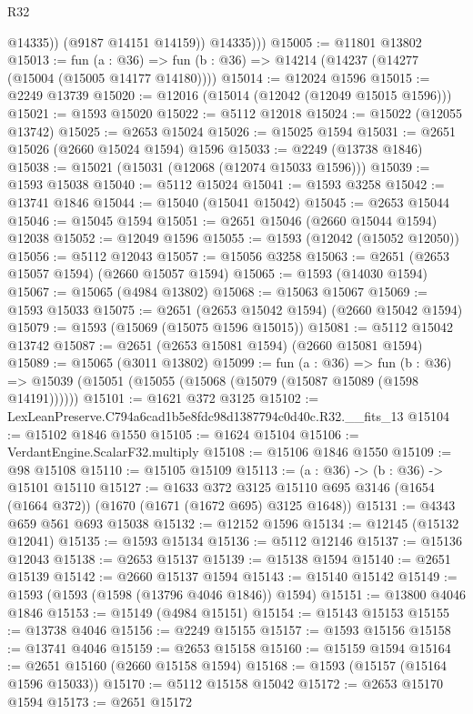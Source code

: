 \begin{lexlean}{R32}
\begin{coremodule}
                @14335))
            (@9187 @14151 @14159))
          @14335)))
@15005 := @11801 @13802
@15013 := fun (a : @36) => fun (b : @36) => @14214 (@14237 (@14277 (@15004 (@15005 @14177 @14180))))
@15014 := @12024 @1596
@15015 := @2249 @13739
@15020 := @12016 (@15014 (@12042 (@12049 @15015 @1596)))
@15021 := @1593 @15020
@15022 := @5112 @12018
@15024 := @15022 (@12055 @13742)
@15025 := @2653 @15024
@15026 := @15025 @1594
@15031 := @2651 @15026 (@2660 @15024 @1594) @1596
@15033 := @2249 (@13738 @1846)
@15038 := @15021 (@15031 (@12068 (@12074 @15033 @1596)))
@15039 := @1593 @15038
@15040 := @5112 @15024
@15041 := @1593 @3258
@15042 := @13741 @1846
@15044 := @15040 (@15041 @15042)
@15045 := @2653 @15044
@15046 := @15045 @1594
@15051 := @2651 @15046 (@2660 @15044 @1594) @12038
@15052 := @12049 @1596
@15055 := @1593 (@12042 (@15052 @12050))
@15056 := @5112 @12043
@15057 := @15056 @3258
@15063 := @2651 (@2653 @15057 @1594) (@2660 @15057 @1594)
@15065 := @1593 (@14030 @1594)
@15067 := @15065 (@4984 @13802)
@15068 := @15063 @15067
@15069 := @1593 @15033
@15075 := @2651 (@2653 @15042 @1594) (@2660 @15042 @1594)
@15079 := @1593 (@15069 (@15075 @1596 @15015))
@15081 := @5112 @15042 @13742
@15087 := @2651 (@2653 @15081 @1594) (@2660 @15081 @1594)
@15089 := @15065 (@3011 @13802)
@15099 := fun (a : @36) =>
  fun (b : @36) => @15039 (@15051 (@15055 (@15068 (@15079 (@15087 @15089 (@1598 @14191))))))
@15101 := @1621 @372 @3125
@15102 := LexLeanPreserve.C794a6cad1b5e8fdc98d1387794c0d40c.R32.__fits_13
@15104 := @15102 @1846 @1550
@15105 := @1624 @15104
@15106 := VerdantEngine.ScalarF32.multiply
@15108 := @15106 @1846 @1550
@15109 := @98 @15108
@15110 := @15105 @15109
@15113 := (a : @36) -> (b : @36) -> @15101 @15110
@15127 := @1633
    @372
    @3125
    @15110
    @695
    @3146
    (@1654 (@1664 @372))
    (@1670 (@1671 (@1672 @695) @3125 @1648))
@15131 := @4343 @659 @561 @693 @15038
@15132 := @12152 @1596
@15134 := @12145 (@15132 @12041)
@15135 := @1593 @15134
@15136 := @5112 @12146
@15137 := @15136 @12043
@15138 := @2653 @15137
@15139 := @15138 @1594
@15140 := @2651 @15139
@15142 := @2660 @15137 @1594
@15143 := @15140 @15142
@15149 := @1593 (@1593 (@1598 (@13796 @4046 @1846)) @1594)
@15151 := @13800 @4046 @1846
@15153 := @15149 (@4984 @15151)
@15154 := @15143 @15153
@15155 := @13738 @4046
@15156 := @2249 @15155
@15157 := @1593 @15156
@15158 := @13741 @4046
@15159 := @2653 @15158
@15160 := @15159 @1594
@15164 := @2651 @15160 (@2660 @15158 @1594)
@15168 := @1593 (@15157 (@15164 @1596 @15033))
@15170 := @5112 @15158 @15042
@15172 := @2653 @15170 @1594
@15173 := @2651 @15172

\end{coremodule}
\end{lexlean}
